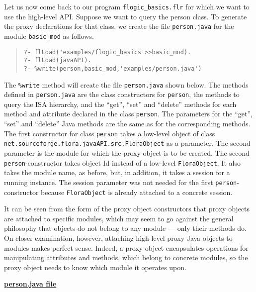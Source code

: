 Let us now come back to our program {\tt flogic\_basics.flr} for which we
want to use the high-level API.  Suppose we want to query the person class.
To generate the proxy declarations for that class, we create
the file {\tt person.java} for the 
module {\tt basic\_mod} as follows.
\begin{quote}
\begin{verbatim}
?- flLoad('examples/flogic_basics'>>basic_mod).
?- flLoad(javaAPI).
?- %write(person,basic_mod,'examples/person.java')
\end{verbatim}
\end{quote}


The {\tt \%write} method will create the file {\tt person.java} shown
below.  The methods defined in {\tt person.java} are the class constructors
for {\tt person}, the methods to query the ISA hierarchy, and the ``get'',
``set'' and ``delete'' methods for each method and attribute declared in
the \FLORA class {\tt person}.  The parameters for the ``get'', ``set'' and
``delete'' Java methods are the same as for the corresponding \FLORA
methods. The first constructor for class {\tt person} takes a low-level
object of class {\tt net.sourceforge.flora.javaAPI.src.FloraObject} as a
parameter. The second parameter is the \FLORA module for which the proxy
object is to be created.
The second {\tt person}-constructor takes \fl object Id instead of a
low-level {\tt FloraObject}. It also takes the module name, as before, but,
in addition, it takes a session for a running \FLORA instance.
The session parameter was not needed for the first {\tt person}-constructor
because {\tt FloraObject} is already attached to a concrete session.  

It can be seen from the form of the proxy object constructors that
proxy objects are attached to specific \FLORA modules, which may seem to
go against the general philosophy that \fl objects do not belong to any
module --- only their methods do. On closer examination, however, attaching
high-level proxy Java objects to modules makes perfect sense. Indeed, a
proxy object encapsulates operations for manipulating \fl attributes 
and methods, which belong to concrete \FLORA modules, so the proxy object
needs to know which module it operates upon.


\underline{{\bf person.java file}}

